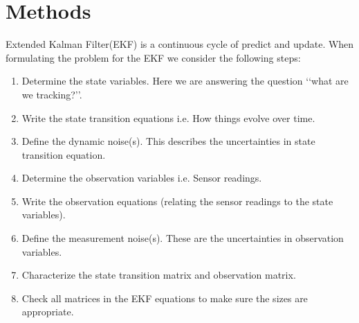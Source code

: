 \documentclass[12pt]{article}
\begin{document}
\section{Methods}
Extended Kalman Filter(EKF) is a continuous cycle of predict and update. When formulating the problem for the EKF we consider the following steps:
\begin{enumerate}
	\item Determine the state variables. Here we are answering the question \lq\lq{}what are we tracking?\rq\rq{}.
	\item Write the state transition equations i.e. How things evolve over time.
	\item Define the dynamic noise(s).  This describes the uncertainties in state transition equation.
	\item Determine the observation variables i.e. Sensor readings.
	\item Write the observation equations (relating the sensor readings to the state variables).
	\item Define the measurement noise(s). These are the uncertainties in observation variables.
	\item Characterize the state transition matrix and observation matrix.
	\item Check all matrices in the EKF equations to make sure the sizes are appropriate.
\end{enumerate}
\end{document}
